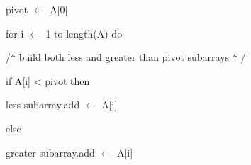 \documentclass[12pt]{article}
\begin{document}
\begin{adjustwidth}{0.54in}{0.0in}
{\fontsize{11pt}{13.2pt}\selectfont pivot $ \leftarrow $  A[0]\par}\par

\end{adjustwidth}

\begin{adjustwidth}{0.54in}{0.0in}
{\fontsize{11pt}{13.2pt}\selectfont for  i $ \leftarrow $  1 to length(A) do\par}\par

\end{adjustwidth}

\begin{adjustwidth}{0.77in}{0.0in}
{\fontsize{11pt}{13.2pt}\selectfont /$\ast$  build both less and greater  than  pivot subarrays  $\ast$ /\par}\par

\end{adjustwidth}

\begin{adjustwidth}{0.77in}{0.0in}
{\fontsize{11pt}{13.2pt}\selectfont if A[i] < pivot then\par}\par

\end{adjustwidth}

\begin{adjustwidth}{1.01in}{0.0in}
{\fontsize{11pt}{13.2pt}\selectfont less subarray.add $ \leftarrow $  A[i]\par}\par

\end{adjustwidth}

\begin{adjustwidth}{0.77in}{0.0in}
{\fontsize{11pt}{13.2pt}\selectfont else\par}\par

\end{adjustwidth}

\begin{adjustwidth}{1.01in}{0.0in}
{\fontsize{11pt}{13.2pt}\selectfont greater  subarray.add $ \leftarrow $  A[i]\par}\par

\end{adjustwidth}
\end{document}
